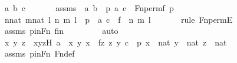 \begin{isabellebody}
\ a\ b\ c\ \isanewline
\ \ \ \ \isamarkupfalse%
\ assms{}\ {\isacharcolon}{\kern0pt}\ {\isachardoublequoteopen}{\isacharless}{\kern0pt}a{\isacharcomma}{\kern0pt}\ b{\isachargreater}{\kern0pt}\ {\isasymin}\ p{\isachardoublequoteclose}\ {\isachardoublequoteopen}{\isacharless}{\kern0pt}a{\isacharcomma}{\kern0pt}\ c{\isachargreater}{\kern0pt}\ {\isasymin}\ Fn{\isacharunderscore}{\kern0pt}perm{\isacharparenleft}{\kern0pt}f{\isacharcomma}{\kern0pt}\ p{\isacharparenright}{\kern0pt}{\isachardoublequoteclose}\ \isanewline
\isanewline
\ \ \ \ \isamarkupfalse%
\ {\isachardoublequoteopen}{\isasymexists}n{\isasymin}nat{\isachardot}{\kern0pt}\ {\isasymexists}m{\isasymin}nat{\isachardot}{\kern0pt}\ {\isasymexists}l{\isasymin}{}{\isachardot}{\kern0pt}\ {\isasymlangle}{\isasymlangle}n{\isacharcomma}{\kern0pt}\ m{\isasymrangle}{\isacharcomma}{\kern0pt}\ l{\isasymrangle}\ {\isasymin}\ p\ {\isasymand}\ {\isacharless}{\kern0pt}a{\isacharcomma}{\kern0pt}\ c{\isachargreater}{\kern0pt}\ {\isacharequal}{\kern0pt}\ {\isasymlangle}{\isasymlangle}f\ {\isacharbackquote}{\kern0pt}\ n{\isacharcomma}{\kern0pt}\ m{\isasymrangle}{\isacharcomma}{\kern0pt}\ l{\isasymrangle}{\isachardoublequoteclose}\isanewline
\ \ \ \ \ \ \isamarkupfalse%
{\isacharparenleft}{\kern0pt}rule\ Fn{\isacharunderscore}{\kern0pt}permE{\isacharparenright}{\kern0pt}\isanewline
\ \ \ \ \ \ \isamarkupfalse%
\ assms{}\ pinFn\ fin\ \isanewline
\ \ \ \ \ \ \isamarkupfalse%
\ auto\isanewline
\ \ \ \ \isamarkupfalse%
\ \isamarkupfalse%
\ x\ y\ z\ \ xyzH{\isacharcolon}{\kern0pt}\ {\isachardoublequoteopen}a\ {\isacharequal}{\kern0pt}\ {\isacharless}{\kern0pt}x{\isacharcomma}{\kern0pt}\ y{\isachargreater}{\kern0pt}{\isachardoublequoteclose}\ {\isachardoublequoteopen}x\ {\isacharequal}{\kern0pt}\ f{\isacharbackquote}{\kern0pt}z{\isachardoublequoteclose}\ {\isachardoublequoteopen}{\isacharless}{\kern0pt}{\isacharless}{\kern0pt}z{\isacharcomma}{\kern0pt}\ y{\isachargreater}{\kern0pt}{\isacharcomma}{\kern0pt}\ c{\isachargreater}{\kern0pt}\ {\isasymin}\ p{\isachardoublequoteclose}\ {\isachardoublequoteopen}x\ {\isasymin}\ nat{\isachardoublequoteclose}\ {\isachardoublequoteopen}y\ {\isasymin}\ nat{\isachardoublequoteclose}\ {\isachardoublequoteopen}z\ {\isasymin}\ nat{\isachardoublequoteclose}\ \isanewline
\ \ \ \ \ \ \isamarkupfalse%
\ assms{}\ pinFn\ Fn{\isacharunderscore}{\kern0pt}def\ \isanewline
\ \ \ \ \ \ \isamarkupfalse%

\end{isabellebody}
